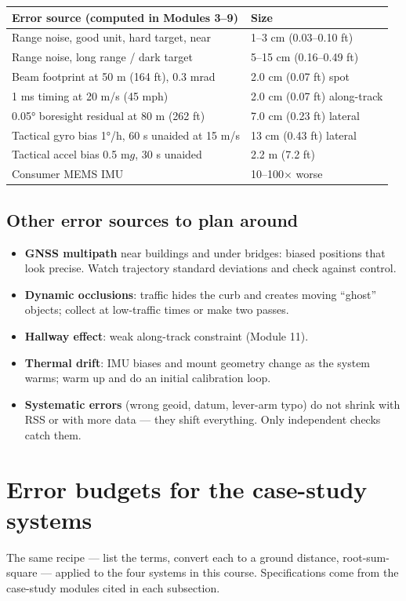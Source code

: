 \begin{center}\small
\renewcommand{\arraystretch}{1.2}
\begin{tabularx}{\linewidth}{Xl}\toprule
\textbf{Error source (computed in Modules 3--9)} & \textbf{Size}\\\midrule
Range noise, good unit, hard target, near & 1--3 cm (0.03--0.10 ft)\\
Range noise, long range / dark target & 5--15 cm (0.16--0.49 ft)\\
Beam footprint at 50 m (164 ft), 0.3 mrad & 2.0 cm (0.07 ft) spot\\
1 ms timing at 20 m/s (45 mph) & 2.0 cm (0.07 ft) along-track\\
0.05° boresight residual at 80 m (262 ft) & 7.0 cm (0.23 ft) lateral\\
Tactical gyro bias 1°/h, 60 s unaided at 15 m/s & 13 cm (0.43 ft) lateral\\
Tactical accel bias 0.5 m$g$, 30 s unaided & 2.2 m (7.2 ft)\\
Consumer MEMS IMU & 10--100$\times$ worse\\\bottomrule
\end{tabularx}\end{center}

\subsection{Other error sources to plan around}
\begin{itemize}
\item \textbf{GNSS multipath} near buildings and under bridges: biased positions that look precise. Watch trajectory standard deviations and check against control.
\item \textbf{Dynamic occlusions}: traffic hides the curb and creates moving ``ghost'' objects; collect at low-traffic times or make two passes.
\item \textbf{Hallway effect}: weak along-track constraint (Module 11).
\item \textbf{Thermal drift}: IMU biases and mount geometry change as the system warms; warm up and do an initial calibration loop.
\item \textbf{Systematic errors} (wrong geoid, datum, lever-arm typo) do not shrink with RSS or with more data --- they shift everything. Only independent checks catch them.
\end{itemize}


\section{Error budgets for the case-study systems}
The same recipe --- list the terms, convert each to a ground distance, root-sum-square --- applied to the four systems in this course. Specifications come from the case-study modules cited in each subsection.

